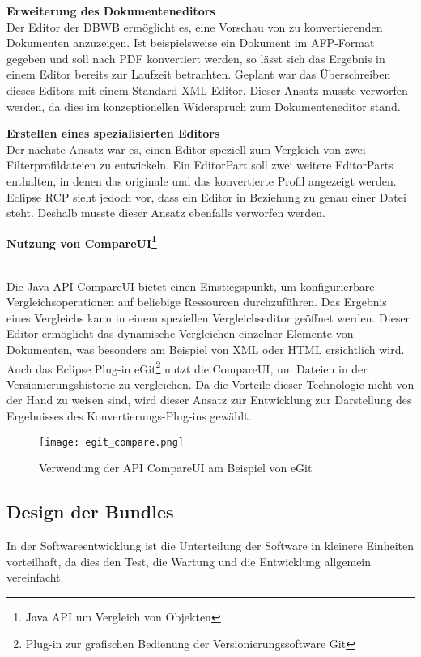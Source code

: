 {{{\textbf{Erweiterung des Dokumenteneditors}{\\
Der Editor der \ac{DBWB} ermöglicht es, eine Vorschau von zu konvertierenden Dokumenten anzuzeigen. Ist beispielsweise ein Dokument im \ac{AFP}-Format gegeben und soll nach \ac{PDF} konvertiert werden, so lässt sich das Ergebnis in einem Editor bereits zur Laufzeit betrachten. Geplant war das Überschreiben dieses Editors mit einem Standard XML-Editor. Dieser Ansatz musste verworfen werden, da dies im konzeptionellen Widerspruch zum Dokumenteneditor stand.
}

\textbf{Erstellen eines spezialisierten Editors}{\\
Der nächste Ansatz war es, einen Editor speziell zum Vergleich von zwei Filterprofildateien zu entwickeln. Ein EditorPart soll zwei weitere EditorParts enthalten, in denen das originale und das konvertierte Profil angezeigt werden. Eclipse \ac{RCP} sieht jedoch vor, dass ein Editor in Beziehung zu genau einer Datei steht. Deshalb musste dieser Ansatz ebenfalls verworfen werden. 
}

\textbf{Nutzung von CompareUI\footnote{Java \ac{API}
 um Vergleich von Objekten}}{\\
 Die Java \ac{API} CompareUI bietet einen Einstiegspunkt, um konfigurierbare Vergleichsoperationen auf beliebige Ressourcen durchzuführen. Das Ergebnis eines Vergleichs kann in einem speziellen Vergleichseditor geöffnet werden. Dieser Editor ermöglicht das dynamische Vergleichen einzelner Elemente von Dokumenten, was besonders am Beispiel von \ac{XML} oder \ac{HTML} ersichtlich wird. Auch das Eclipse Plug-in eGit\footnote{Plug-in zur grafischen Bedienung der Versionierungssoftware Git} nutzt die CompareUI, um Dateien in der Versionierungshistorie zu vergleichen. Da die Vorteile dieser Technologie nicht von der Hand zu weisen sind, wird dieser Ansatz zur Entwicklung zur Darstellung des Ergebnisses des Konvertierungs-Plug-ins gewählt.

\begin{figure}[htbp] 
  \centering
     \texttt{[image: egit\_compare.png]}
  \caption{Verwendung der API CompareUI am Beispiel von eGit}
  \label{fig:egit_compare}
\end{figure}

}



}

}






\subsection{Design der Bundles}{
In der Softwareentwicklung ist die Unterteilung der Software in kleinere Einheiten vorteilhaft, da dies den Test, die Wartung und die Entwicklung allgemein vereinfacht.




}}
